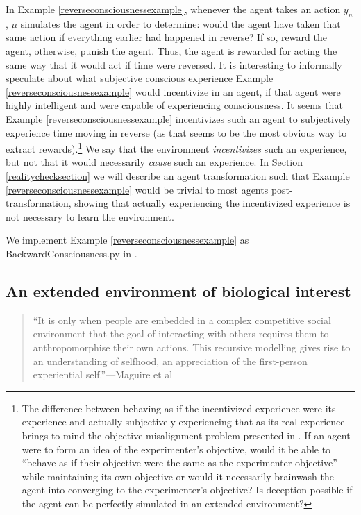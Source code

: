 \documentclass{article}
\begin{document}
In Example \ref{reverseconsciousnessexample}, whenever the agent takes an action $y_n$,
$\mu$ simulates the agent in order to determine: would the agent have taken that same
action if everything earlier had happened in reverse?
If so, reward the agent, otherwise, punish the agent.
Thus, the agent is rewarded for acting the same way that it would act if time were
reversed. It is interesting to informally speculate about what subjective conscious
experience Example \ref{reverseconsciousnessexample} would incentivize in an agent,
if that agent were highly intelligent and were capable of experiencing consciousness.
It seems that Example \ref{reverseconsciousnessexample} incentivizes such an agent to
subjectively experience time moving in reverse (as that seems to be the most
obvious way to extract rewards).\footnote{The
difference between behaving as if
the incentivized experience were its experience and actually subjectively
experiencing that as its real experience brings to mind the objective misalignment
problem presented in \cite{hubinger2019risks}. If an agent were to form an
idea of the experimenter's objective, would it be able to ``behave as if
their objective were the same as the experimenter objective'' while maintaining its own
objective or would it necessarily brainwash the agent into converging to the
experimenter's objective? Is deception possible if the agent can be perfectly
simulated in an extended environment?} We say that the environment \emph{incentivizes}
such an experience, but not that it would necessarily \emph{cause} such an experience.
In Section \ref{realitychecksection} we will describe an agent transformation such that
Example \ref{reverseconsciousnessexample} would be trivial to most agents post-transformation,
showing that actually experiencing the incentivized experience is not necessary to
learn the environment.

We implement Example \ref{reverseconsciousnessexample} as BackwardConsciousness.py
in \cite{library}.

\subsection{An extended environment of biological interest}

\begin{quote}
``It  is  only  when  people  are  embedded  in  a  complex  competitive  social
environment  that  the  goal  of  interacting  with  others  requires  them
to  anthropomorphise  their  own  actions. This recursive modelling gives rise to
an understanding of selfhood, an appreciation of the first-person experiential
self.''---Maguire et al \cite{maguire2016understanding}
\end{quote}
\end{document}
